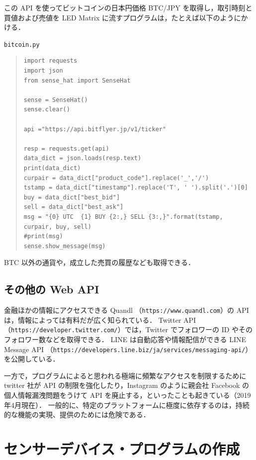 \documentclass[11pt,a4,epsf]{article}
\begin{document}
この API を使ってビットコインの日本円価格 BTC/JPY を取得し，取引時刻と買値および売値を LED Matrix に流すプログラムは，たとえば以下のようにかける．
\begin{itembox}[l]{\tt bitcoin.py}
\begin{quote}
\small
\begin{verbatim}
import requests
import json
from sense_hat import SenseHat

sense = SenseHat()
sense.clear()
 
api ="https://api.bitflyer.jp/v1/ticker"
 
resp = requests.get(api)
data_dict = json.loads(resp.text) 
print(data_dict)
curpair = data_dict["product_code"].replace('_','/')
tstamp = data_dict["timestamp"].replace('T', ' ').split('.')[0]
buy = data_dict["best_bid"]
sell = data_dict["best_ask"]
msg = "{0} UTC  {1} BUY {2:,} SELL {3:,}".format(tstamp, curpair, buy, sell)
#print(msg)
sense.show_message(msg)
\end{verbatim}
\end{quote}
\end{itembox}
BTC 以外の通貨や，成立した売買の履歴なども取得できる．

\subsection{その他の Web API}

金融ほかの情報にアクセスできる Quandl （\verb+https://www.quandl.com+）の API は，情報によっては有料だが広く知られている．
Twitter API （\verb+https://developer.twitter.com/+）では，Twitter でフォロワーの ID やそのフォロワー数などを取得できる．
LINE は自動応答や情報配信ができる LINE Message API （\verb+https://developers.line.biz/ja/services/messaging-api/+）を公開している．

一方で，プログラムによると思われる極端に頻繁なアクセスを制限するために twitter 社が API の制限を強化したり，Instagram のように親会社 Facebook の個人情報漏洩問題をうけて API を廃止する，といったことも起きている（2019年4月現在）．
一般的に、特定のプラットフォームに極度に依存するのは，持続的な機能の実現、提供のためには危険である．



\section{センサーデバイス・プログラムの作成}
\end{document}
